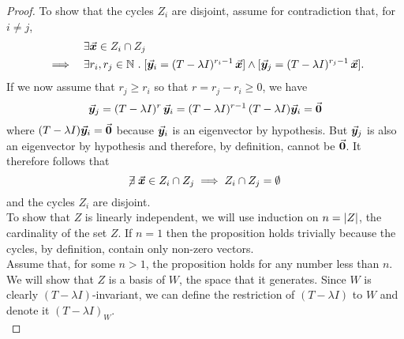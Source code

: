\documentclass[../MathsNotesBase.tex]{subfiles}
\begin{document}
{		
		\bigskip
		\begin{proof}
			To show that the cycles $Z_i$ are disjoint, assume for contradiction that, for ${ i \neq j }$,
			\[\begin{aligned}
				&& &\exists \vec{\bm{x}} \in Z_i \cap Z_j \\
				&\implies & &\exists r_i,r_j \in \mathbb{N}^{} \;.\; [ \vec{\bm{y}}_i = (T - \lambda I)^{r_i - 1}\,\vec{\bm{x}} ] \land [ \vec{\bm{y}}_j = (T - \lambda I)^{r_j - 1}\,\vec{\bm{x}} ].
			\end{aligned}\]
			If we now assume \WLOG that ${ r_j \geq r_i }$ so that ${ r = r_j - r_i \geq 0 }$, we have
			\[ \vec{\bm{y}}_j = (T - \lambda I)^r\,\vec{\bm{y}}_i = (T - \lambda I)^{r-1}\,(T - \lambda I) \vec{\bm{y}}_i = \vec{\bm{0}} \]
			where ${ (T - \lambda I) \vec{\bm{y}}_i = \vec{\bm{0}} }$ because $\vec{\bm{y}}_i$ is an eigenvector by hypothesis. But $\vec{\bm{y}}_j$ is also an eigenvector by hypothesis and therefore, by definition, cannot be $\vec{\bm{0}}$. It therefore follows that
			\[ \centernot\exists  \x \in Z_i \cap Z_j \implies Z_i \cap Z_j = \emptyset \]
			and the cycles $Z_i$ are disjoint.\\
			
			To show that $Z$ is linearly independent, we will use induction on ${ n = \left\lvert Z\right\rvert }$, the cardinality of the set $Z$. If ${ n = 1 }$ then the proposition holds trivially because the cycles, by definition, contain only non-zero vectors.\\
			
			Assume that, for some ${ n > 1 }$, the proposition holds for any number less than $n$. We will show that $Z$ is a basis of $W$, the space that it generates. Since $W$ is clearly $(T - \lambda I)$-invariant, we can define the restriction of $(T - \lambda I)$ to $W$ and denote it $(T - \lambda I)_W$.\\
			

\end{proof}}
\end{document}
